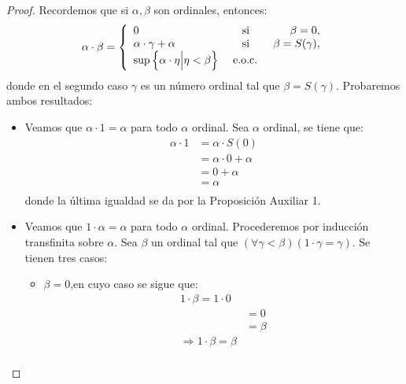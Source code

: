 \documentclass[12pt]{article}
\newcounter{it}
\theoremstyle{largebreak}
\begin{document}
    \begin{proof}
        Recordemos que si $\alpha,\beta$ son ordinales, entonces:
        \begin{equation*}
            \alpha\cdot\beta=\left\{
                \begin{array}{lcr}
                    0 & \textup{ si } & \beta=0,\\
                    \alpha\cdot\gamma+\alpha & \textup{ si } & \beta=S(\gamma),\\
                    \sup\left\{\alpha\cdot\eta\Big|\eta<\beta \right\} & \textup{ e.o.c. }
                \end{array}
            \right.
        \end{equation*}
        donde en el segundo caso $\gamma$ es un número ordinal tal que $\beta=S(\gamma)$. Probaremos ambos resultados:
        \begin{itemize}
            \item Veamos que $\alpha\cdot1=\alpha$ para todo $\alpha$ ordinal. Sea $\alpha$ ordinal, se tiene que:
            \begin{equation*}
                \begin{split}
                    \alpha\cdot1&=\alpha\cdot S(0)\\
                    &=\alpha\cdot0+\alpha\\
                    &=0+\alpha\\
                    &=\alpha\\
                \end{split}
            \end{equation*}
            donde la última igualdad se da por la Proposición Auxiliar 1.
            \item Veamos que $1\cdot\alpha=\alpha$ para todo $\alpha$ ordinal. Procederemos por inducción transfinita sobre $\alpha$. Sea $\beta$ un ordinal tal que $(\forall\gamma<\beta)(1\cdot\gamma=\gamma)$. Se tienen tres casos:
            \begin{itemize}
                \item $\beta=0$,en cuyo caso se sigue que:
                \begin{equation*}
                    \begin{split}
                        1\cdot\beta=1\cdot0\\
                        &=0\\
                        &=\beta\\
                        \Rightarrow 1\cdot\beta=\beta\\

\end{split}
\end{equation*}
\end{itemize}
\end{itemize}
\end{proof}
\end{document}
